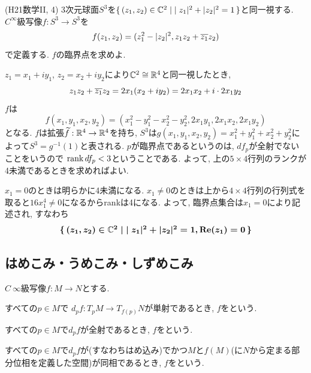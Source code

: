 \begin{egprob} (H21数学II, 4)
3次元球面$S^3$を$\set{(z_1,z_2)\in \mathbb{C}^2 \mid |z_1|^2 + |z_2|^2 = 1}$と同一視する. $C^{\infty}$級写像$f:S^3\to S^3$を
\[f(z_1,z_2) = (z_1^2 - |z_2|^2, z_1z_2 + \overline{z_1} z_2)\]
で定義する. $f$の臨界点を求めよ.
\end{egprob}
\begin{egans}
$z_1 = x_1+iy_1$, $z_2 = x_2 + iy_2$により$\mathbb{C}^2\cong \mathbb{R}^4$と同一視したとき,
\[
z_1z_2 + \overline{z_1}z_2 = 2x_1(x_2+iy_2) = 2x_1x_2 + i\cdot 2x_1y_2
\]
$f$は
\[
f(x_1,y_1,x_2,y_2) = (x_{1}^{2} - y_{1}^{2} - x_{2}^{2} - y_{2}^{2}, 2x_1y_1, 2x_1x_2, 2x_1y_2)
\]
となる.
$f$は拡張$\widetilde{f}:\mathbb{R}^4 \to \mathbb{R}^4$を持ち, $S^3$は$g(x_1,y_1,x_2,y_2) = x_1^2+y_1^2+x_2^2+y_2^2$によって$S^3 = g^{-1}(1)$と表される.
$p$が臨界点であるというのは, $df_p$が全射でないことをいうので $\mathrm{rank}\, df_p < 3$ということである. よって, 上の$5\times 4$行列のランクが4未満であるときを求めればよい.\par
$x_1 = 0$のときは明らかに4未満になる. $x_1\neq 0$のときは上から$4\times 4$行列の行列式を取ると$16x_1^4 \neq 0$になるからrankは4になる. よって, 臨界点集合は$x_1 = 0$により記述され, すなわち
\[{\mbox{\boldmath $\set{(z_1,z_2)\in \mathbb{C}^2\mid |z_1|^2 + |z_2|^2 = 1, \mathrm{Re}(z_1) = 0}$}}\]

\end{egans}






\subsection{はめこみ・うめこみ・しずめこみ}
\begin{defn} $C~{\infty}$級写像$f:M\to N$とする.
\ben
\item すべての$p\in M$で $d_p f: T_{p}M \to T_{f(p)}N$が単射であるとき, $f$をという.
\item すべての$p\in M$で$d_{p} f$が全射であるとき, $f$をという.
\item すべての$p\in M$で$d_{p} f$が(すなわちはめ込み)でかつ$M$と$f(M)$(に$N$から定まる部分位相を定義した空間)が同相であるとき, $f$をという.
\een
\end{defn}

